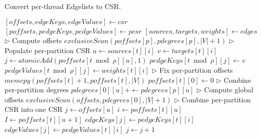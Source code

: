 \begin{algorithm}[hbtp]
\caption{Convert per-thread Edgelists to CSR.}
\label{alg:csr}
\begin{algorithmic}[1]

\Statex

  \State $[offsets, edgeKeys, edgeValues] \gets csr$ \label{alg:csr--initialize-begin}
  \State $[poffsets, pedgeKeys, pedgeValues] \gets pcsr$
  \State $[sources, targets, weights] \gets edges$ \label{alg:csr--initialize-end}
  \State $\rhd$ Compute offsets
  \ForAll{$p \in [0, \rho)$} \label{alg:csr--poffsets-begin}
    \State $exclusiveScan(poffsets[p], pdegrees[p], |V|+1)$
  \EndFor \label{alg:csr--poffsets-end}
  \State $\rhd$ Populate per-partition CSR
   \label{alg:csr--pcsr-begin}
    \ForAll{$i \in [0, counts[t])$}
      \State $u \gets sources[t][i]$
      \State $v \gets targets[t][i]$
      \State $j \gets atomicAdd(poffsets[t \bmod \rho][u], 1)$
      \State $pedgeKeys[t \bmod \rho][j] \gets v$
        \State $pedgeValues[t \bmod \rho][j] \gets weights[t][i]$
      \EndIf
    \EndFor
  \EndFor \label{alg:csr--pcsr-end}
  \State $\rhd$ Fix per-partition offsets
   \label{alg:csr--poffsets-fix-begin}
      \State $memcpy(poffsets[t]+1, poffsets[t], |V|)$
      \State $poffsets[t][0] \gets 0$
    \EndIf
  \EndFor \label{alg:csr--poffsets-fix-end}
  \State $\rhd$ Combine per-partition degrees
  \ForAll{$u \in [0, |V|)$ \textbf{in parallel}} \label{alg:csr--poffsets-combine-begin}
    \ForAll{$p \in [1, \rho)$}
      \State $pdegrees[0][u] +\gets pdegrees[p][u]$
    \EndFor
  \EndFor \label{alg:csr--poffsets-combine-end}
  \State $\rhd$ Compute global offsets
  \State $exclusiveScan(offsets, pdegrees[0], |V|+1)$ \label{alg:csr--offsets-compute}
  \State $\rhd$ Combine per-partition CSR into one CSR
  \ForAll{$u \in [0, |V|)$ \textbf{in parallel}} \label{alg:csr--pcsr-combine-begin}
    \State $j \gets offsets[u]$
    \ForAll{$p \in [0, \rho)$}
      \State $i \gets poffsets[t][u]$
      \State $I \gets poffsets[t][u+1]$
      \ForAll{$i \in [i, I)$}
        \State $edgeKeys[j] \gets pedgeKeys[t][i]$
          \State $edgeValues[j] \gets pedgeValues[t][i]$
        \EndIf
        \State $j \gets j + 1$
      \EndFor
    \EndFor
  \EndFor \label{alg:csr--pcsr-combine-end}
\EndFunction
\end{algorithmic}
\end{algorithm}
